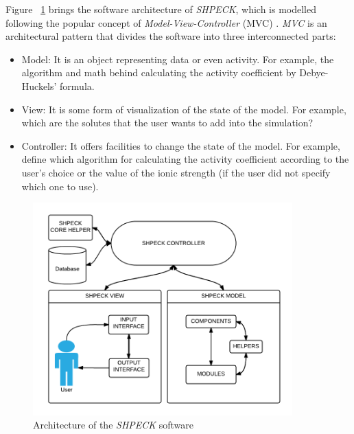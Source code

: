 Figure ~\ref{fig:shpeck-architecture} brings the software architecture of \emph{SHPECK}, which is modelled following the popular concept of \emph{Model-View-Controller} (MVC) \cite{Gamma:94}. \emph{MVC} is an architectural pattern that divides the software into three interconnected parts:
\begin{itemize}
\item Model: It is an object representing data or even activity. For example, the algorithm and math behind calculating the activity coefficient by Debye-Huckels' formula.
\item View: It is some form of visualization of the state of the model. For example, which are the solutes that the user wants to add into the simulation?
\item Controller: It offers facilities to change the state of the model. For example, define which algorithm for calculating the activity coefficient according to the user's choice or the value of the ionic strength (if the user did not specify which one to use).
\end{itemize}

\begin{figure}[ht!]
\centering
\includegraphics[width=100mm]{figures/shpeck-architecture.png}
\caption{Architecture of the \emph{SHPECK} software}
\label{fig:shpeck-architecture}
\end{figure}

